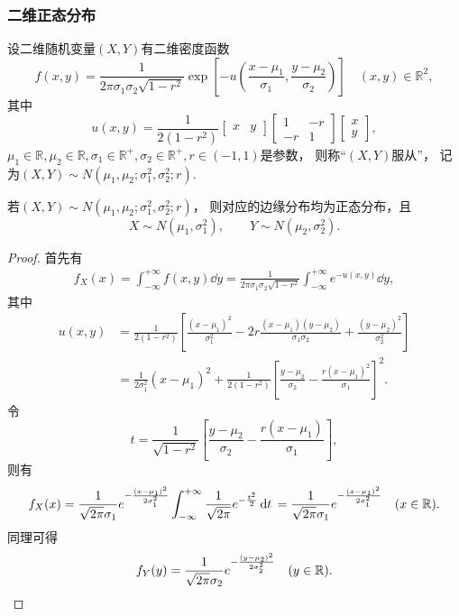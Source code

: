 \subsubsection{二维正态分布}
\begin{definition}
设二维随机变量\((X,Y)\)有二维密度函数
\begin{equation}
	f(x,y) = \frac{1}{2\pi\sigma_1\sigma_2\sqrt{1-r^2}}
		\exp\left[- u\left(
			\frac{x-\mu_1}{\sigma_1},
			\frac{y-\mu_2}{\sigma_2}
		\right)\right]
	\quad(x,y)\in\mathbb{R}^2,
\end{equation}
其中\[
	u(x,y)
	= \frac{1}{2(1-r^2)}
	\begin{bmatrix}
		x & y
	\end{bmatrix}
	\begin{bmatrix}
		1 & -r \\
		-r & 1
	\end{bmatrix}
	\begin{bmatrix}
		x \\ y
	\end{bmatrix},
\]
\(\mu_1\in\mathbb{R},
\mu_2\in\mathbb{R},
\sigma_1\in\mathbb{R}^+,
\sigma_2\in\mathbb{R}^+,
r\in(-1,1)\)是参数，
则称“\((X,Y)\)服从”，
记为\((X,Y) \sim N(\mu_1,\mu_2;\sigma_1^2,\sigma_2^2;r)\).
\end{definition}

\begin{theorem}\label{theorem:正态分布与自然指数分布族.性质1}
若\((X,Y) \sim N(\mu_1,\mu_2;\sigma_1^2,\sigma_2^2;r)\)，
则对应的边缘分布均为正态分布，且\[
	X \sim N(\mu_1,\sigma_1^2),
	\qquad
	Y \sim N(\mu_2,\sigma_2^2).
\]
\begin{proof}
首先有\begin{align*}
	f_X(x) = \int_{-\infty}^{+\infty} f(x,y) \dd{y}
	= \frac{1}{2\pi\sigma_1\sigma_2\sqrt{1-r^2}}
		\int_{-\infty}^{+\infty} e^{-u(x,y)} \dd{y},
\end{align*}
其中\begin{align*}
	u(x,y)
	&= \frac{1}{2(1-r^2)} \left[
			\frac{(x-\mu_1)^2}{\sigma_1^2}
			-2r\frac{(x-\mu_1)(y-\mu_2)}{\sigma_1\sigma_2}
			+\frac{(y-\mu_2)^2}{\sigma_2^2}
		\right] \\
	&= \frac{1}{2 \sigma_1^2} (x-\mu_1)^2
		+ \frac{1}{2(1-r^2)} \left[
			\frac{y-\mu_2}{\sigma_2}
			- \frac{r(x-\mu_1)^2}{\sigma_1}
		\right]^2.
\end{align*}
令\[
	t = \frac{1}{\sqrt{1-r^2}} \left[
		\frac{y-\mu_2}{\sigma_2}
		- \frac{r(x-\mu_1)}{\sigma_1}
	\right],
\]
则有\[
	f_X(x)
	= \frac{1}{\sqrt{2\pi} \sigma_1} e^{-\frac{(x-\mu_1)^2}{2\sigma_1^2}} \int_{-\infty}^{+\infty} \frac{1}{\sqrt{2\pi}} e^{-\frac{t^2}{2}} \dd{t} \\
	= \frac{1}{\sqrt{2\pi} \sigma_1} e^{-\frac{(x-\mu_1)^2}{2\sigma_1^2}}
	\quad(x\in\mathbb{R}).
\]
同理可得\[
	f_Y(y)
	= \frac{1}{\sqrt{2\pi} \sigma_2} e^{-\frac{(y-\mu_2)^2}{2\sigma_2^2}}
	\quad(y\in\mathbb{R}).
	\qedhere
\]
\end{proof}
\end{theorem}

